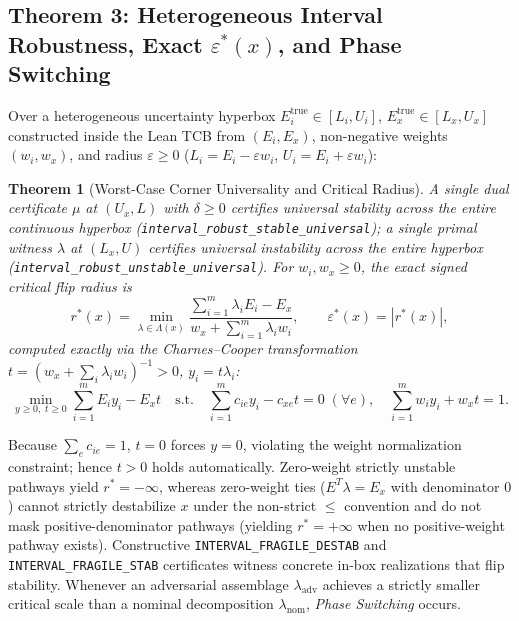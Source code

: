 \documentclass[11pt,a4paper]{article}
\newcommand{\br}{\allowbreak{}}
\newtheorem{theorem}{Theorem}
\begin{document}
\subsection{Theorem 3: Heterogeneous Interval Robustness, Exact $\varepsilon^*(x)$, and Phase Switching}
Over a heterogeneous uncertainty hyperbox $E_i^{\mathrm{true}} \in [L_i, U_i]$, $E_x^{\mathrm{true}} \in [L_x, U_x]$ constructed inside the Lean TCB from $(E_i, E_x)$, non-negative weights $(w_i, w_x)$, and radius $\varepsilon \ge 0$ ($L_i = E_i - \varepsilon w_i$, $U_i = E_i + \varepsilon w_i$):

\begin{theorem}[Worst-Case Corner Universality and Critical Radius]
A single dual certificate $\mu$ at $(U_x, L)$ with $\delta \ge 0$ certifies universal stability across the entire continuous hyperbox (\texttt{interval\_\br{}robust\_\br{}stable\_\br{}universal}); a single primal witness $\lambda$ at $(L_x, U)$ certifies universal instability across the entire hyperbox (\texttt{interval\_\br{}robust\_\br{}unstable\_\br{}universal}). For $w_i, w_x \ge 0$, the exact signed critical flip radius is
\begin{equation}
  r^*(x) = \min_{\lambda \in \Lambda(x)} \frac{\sum_{i=1}^m \lambda_i E_i - E_x}{w_x + \sum_{i=1}^m \lambda_i w_i}, \qquad \varepsilon^*(x) = |r^*(x)|,
\end{equation}
computed exactly via the Charnes--Cooper transformation~\cite{charnes1962fractional} $t = (w_x + \sum_i \lambda_i w_i)^{-1} > 0$, $y_i = t\lambda_i$:
\begin{equation}
  \min_{y \ge 0,\; t \ge 0} \sum_{i=1}^m E_i y_i - E_x t \quad \mathrm{s.t.} \quad \sum_{i=1}^m c_{ie} y_i - c_{xe} t = 0\;(\forall e), \quad \sum_{i=1}^m w_i y_i + w_x t = 1.
\end{equation}
\end{theorem}

Because $\sum_e c_{ie} = 1$, $t=0$ forces $y=0$, violating the weight normalization constraint; hence $t > 0$ holds automatically. Zero-weight strictly unstable pathways yield $r^* = -\infty$, whereas zero-weight ties ($E^T\lambda = E_x$ with denominator $0$) cannot strictly destabilize $x$ under the non-strict $\le$ convention and do not mask positive-denominator pathways (yielding $r^* = +\infty$ when no positive-weight pathway exists). Constructive \texttt{INTERVAL\_\br{}FRAGILE\_\br{}DESTAB} and \texttt{INTERVAL\_\br{}FRAGILE\_\br{}STAB} certificates witness concrete in-box realizations that flip stability. Whenever an adversarial assemblage $\lambda_{\mathrm{adv}}$ achieves a strictly smaller critical scale than a nominal decomposition $\lambda_{\mathrm{nom}}$, \emph{Phase Switching} occurs.
\end{document}
